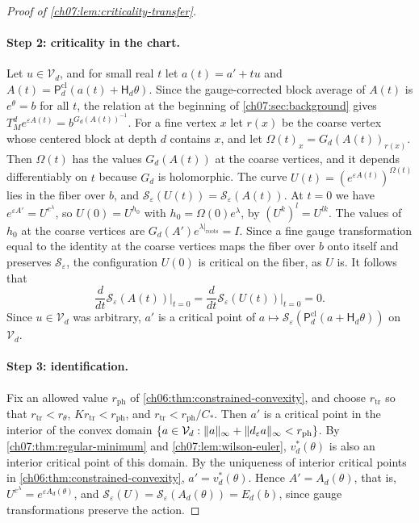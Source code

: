 \begin{proof}[Proof of \cref{ch07:lem:criticality-transfer}]
\paragraph{Step 2: criticality in the chart.}
Let $u\in\mathcal V_d$, and for small real $t$ let $a(t)=a'+tu$ and $A(t)=\mathsf P_d^{\mathrm{cl}}(a(t)+\mathsf H_d\theta)$. Since the gauge-corrected block average of $A(t)$ is $e^\theta=b$ for all $t$, the relation at the beginning of \cref{ch07:sec:background} gives $T_M^de^{\varepsilon A(t)}=b^{G_d(A(t))^{-1}}$. For a fine vertex $x$ let $r(x)$ be the coarse vertex whose centered block at depth $d$ contains $x$, and let $\Omega(t)_x=G_d(A(t))_{r(x)}$. Then $\Omega(t)$ has the values $G_d(A(t))$ at the coarse vertices, and it depends differentiably on $t$ because $G_d$ is holomorphic. The curve $U(t)=(e^{\varepsilon A(t)})^{\Omega(t)}$ lies in the fiber over $b$, and $\mathscr S_\varepsilon(U(t))=\mathscr S_\varepsilon(A(t))$. At $t=0$ we have $e^{\varepsilon A'}=U^{e^\lambda}$, so $U(0)=U^{h_0}$ with $h_0=\Omega(0)e^\lambda$, by $(U^k)^l=U^{lk}$. The values of $h_0$ at the coarse vertices are $G_d(A')e^{\lambda|_{\mathrm{roots}}}=I$. Since a fine gauge transformation equal to the identity at the coarse vertices maps the fiber over $b$ onto itself and preserves $\mathscr S_\varepsilon$, the configuration $U(0)$ is critical on the fiber, as $U$ is. It follows that
\[
 \frac d{dt}\mathscr S_\varepsilon(A(t))\Big|_{t=0}=\frac d{dt}\mathscr S_\varepsilon(U(t))\Big|_{t=0}=0 .
\]
Since $u\in\mathcal V_d$ was arbitrary, $a'$ is a critical point of $a\mapsto\mathscr S_\varepsilon(\mathsf P_d^{\mathrm{cl}}(a+\mathsf H_d\theta))$ on $\mathcal V_d$.

\paragraph{Step 3: identification.}
Fix an allowed value $r_{\mathrm{ph}}$ of \cref{ch06:thm:constrained-convexity}, and choose $r_{\mathrm{tr}}$ so that $r_{\mathrm{tr}}<r_\theta$, $Kr_{\mathrm{tr}}<r_{\mathrm{ph}}$, and $r_{\mathrm{tr}}<r_{\mathrm{ph}}/C_*$. Then $a'$ is a critical point in the interior of the convex domain $\{a\in\mathcal V_d:\lVert a\rVert_\infty+\lVert d_\varepsilon a\rVert_\infty<r_{\mathrm{ph}}\}$. By \cref{ch07:thm:regular-minimum} and \cref{ch07:lem:wilson-euler}, $v_d^*(\theta)$ is also an interior critical point of this domain. By the uniqueness of interior critical points in \cref{ch06:thm:constrained-convexity}, $a'=v_d^*(\theta)$. Hence $A'=A_d(\theta)$, that is, $U^{e^\lambda}=e^{\varepsilon A_d(\theta)}$, and $\mathscr S_\varepsilon(U)=\mathscr S_\varepsilon(A_d(\theta))=E_d(b)$, since gauge transformations preserve the action.
\end{proof}

